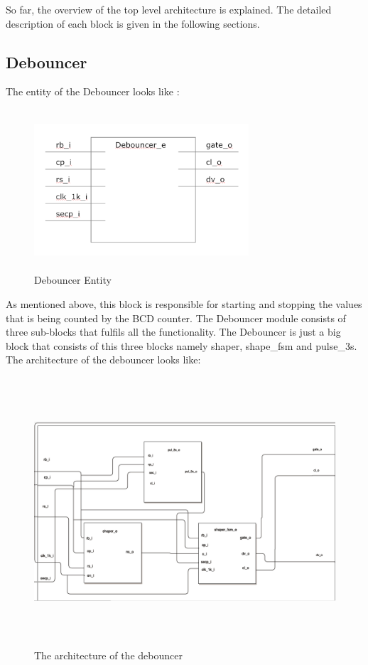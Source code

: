 \documentclass[12pt,a4paper]{article}
\begin{document}
So far, the overview of the top level architecture is explained. The detailed description of each block is given in the following sections.\

\subsection{Debouncer}
The entity of the Debouncer looks like :\\

\begin{figure}[H]
\centering
\includegraphics[width=8cm,height=6cm]{debouncere.PNG}
\caption{Debouncer Entity}
\label{Debouncer Entity}
\end{figure}

As mentioned above, this block is responsible for starting and stopping the values that is being counted by the BCD counter. The Debouncer module consists of three sub-blocks that fulfils all the functionality. The Debouncer is just a big block that consists of this three blocks namely shaper, shape\_fsm and pulse\_3s. The architecture of the debouncer looks like:

\begin{figure}[H]
\centering
\includegraphics[width=16cm,height=10cm]{Debouncer_arc.PNG}
\caption{The architecture of the debouncer}
\label{the architecture of the debouncer}
\end{figure}
\end{document}
